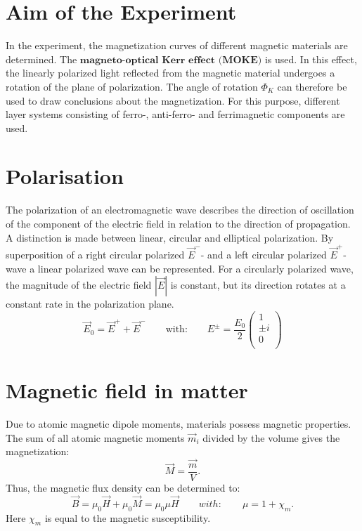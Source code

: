 \section{Aim of the Experiment}

In the experiment, the magnetization curves of different magnetic materials are determined. The $\textbf{magneto-optical Kerr effect (MOKE)} $ is used. In this effect, the linearly polarized light reflected from the magnetic material undergoes a rotation of the plane of polarization. The angle of rotation $\Phi_K$ can therefore be used to draw conclusions about the magnetization. For this purpose, different layer systems consisting of ferro-, anti-ferro- and ferrimagnetic components are used.


\section{Polarisation}

The polarization of an electromagnetic wave describes the direction of oscillation of the component of the electric field in relation to the direction of propagation. A distinction is made between linear, circular and elliptical polarization. By superposition of a right circular polarized $\Vec{E}^-$- and a left circular polarized $\Vec{E}^+$-wave a linear polarized wave can be represented. For a circularly polarized wave, the magnitude of the electric field $|\Vec{E}|$ is constant, but its direction rotates at a constant rate in the polarization plane. 
\begin{equation}
    \Vec{E}_0 = \Vec{E}^+ + \Vec{E}^- \qquad \text{with:} \qquad E^{\pm}=\frac{E_0}{2} 
    \left (
    \begin{array}{c}
         1 \\
         \pm i\\
         0\\
    \end{array}
    \right)
    \label{eq:pol}
\end{equation}

\section{Magnetic field in matter}
Due to atomic magnetic dipole moments, materials possess magnetic properties. The sum of all atomic magnetic moments $\Vec{m}_i$ divided by the volume gives the magnetization:
\begin{equation}
    \Vec{M} = \frac{\Vec{m}}{V}.
\end{equation}
Thus, the magnetic flux density can be determined to:
\begin{equation}
    \Vec{B} = \mu_0 \Vec{H} + \mu_0\Vec{M} =\mu_0\mu\Vec{H} \qquad with: \qquad \mu=1+\chi_m.
\end{equation}
Here $\chi_m$ is equal to the magnetic susceptibility.

